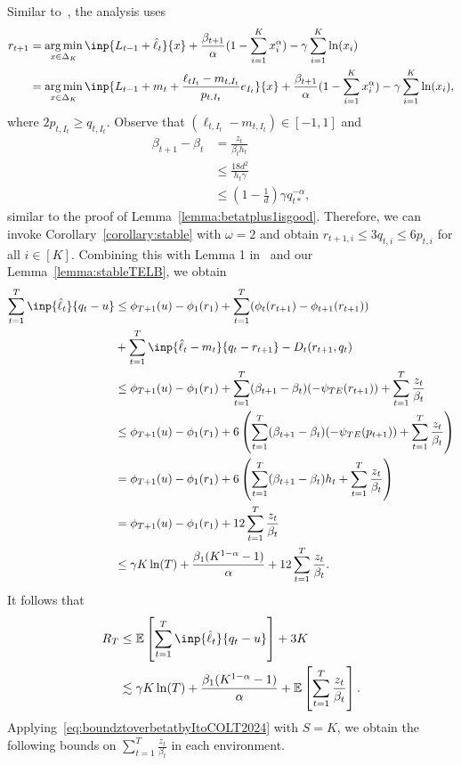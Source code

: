 Similar to~\cite{ItoCOLT2022aVariance}, the analysis uses 
\begin{align*}
    r_{t+1} &= \argmin_{x \in \Delta_K} \inp{L_{t-1} + \hat{\ell}_t}{x} + \frac{\beta_{t+1}}{\alpha}(1 - \sum_{i=1}^K x_i^\alpha) - \gamma\sum_{i=1}^K \ln(x_i) \\
    &= \argmin_{x \in \Delta_K} \inp{L_{t-1} + m_t + \frac{\ell_{tI_t} - m_{t,I_t}}{p_{t,I_t}}e_{I_t}}{x} + \frac{\beta_{t+1}}{\alpha}(1 - \sum_{i=1}^K x_i^\alpha) - \gamma\sum_{i=1}^K \ln(x_i),
\end{align*}
where $2p_{t,I_t} \geq q_{t,I_t}$.
Observe that $(\ell_{t,I_t} - m_{t,I_t}) \in [-1,1]$ and 
\begin{align*}
    \beta_{t+1} - \beta_t &= \frac{z_t}{\beta_{t}h_t} \\
    &\leq \frac{18d^2}{h_t\gamma} \\
    &\leq \left(1 - \frac{1}{d}\right)\gamma q_{t*}^{-\alpha},
\end{align*} 
similar to the proof of Lemma~\ref{lemma:betatplus1isgood}. 
%
Therefore, we can invoke Corollary~\ref{corollary:stable} with $\omega = 2$ and obtain $r_{t+1,i} \leq 3q_{t,i} \leq 6p_{t,i}$ for all $i \in [K]$. Combining this with Lemma 1 in~\cite{ItoCOLT2022aVariance} and our Lemma~\ref{lemma:stableTELB}, we obtain
\begin{align*}
    \sum_{t=1}^T \inp{\hat{\ell}_t}{q_t - u} &\leq \phi_{T+1}(u) - \phi_1(r_1)
    + \sum_{t=1}^T(\phi_{t}(r_{t+1}) - \phi_{t+1}(r_{t+1})) \\
    &+ \sum_{t=1}^T \inp{\hat{\ell}_t - m_t}{q_t - r_{t+1}} - D_t(r_{t+1}, q_t) \\
    &\leq \phi_{T+1}(u) - \phi_1(r_1) + \sum_{t=1}^T(\beta_{t+1} - \beta_t)(-\psi_{TE}(r_{t+1})) + \sum_{t=1}^T \frac{z_t}{\beta_t} \\
    &\leq \phi_{T+1}(u) - \phi_1(r_1) + 6\left(\sum_{t=1}^T(\beta_{t+1} - \beta_t)(-\psi_{TE}(p_{t+1})) + \sum_{t=1}^T \frac{z_t}{\beta_t}\right) \\
    &= \phi_{T+1}(u) - \phi_1(r_1) + 6\left(\sum_{t=1}^T(\beta_{t+1} - \beta_t)h_t + \sum_{t=1}^T \frac{z_t}{\beta_t}\right) \\
    &= \phi_{T+1}(u) - \phi_1(r_1) + 12\sum_{t=1}^T \frac{z_t}{\beta_t} \\
    &\leq \gamma K\ln(T) + \frac{\beta_1 (K^{1-\alpha} - 1)}{\alpha} + 12\sum_{t=1}^T \frac{z_t}{\beta_t}.
\end{align*}
It follows that
\begin{align*}
    R_T &\leq \E\left[\sum_{t=1}^T \inp{\hat{\ell}_t}{q_t - u}\right] + 3K \\
    &\lesssim \gamma K\ln(T) + \frac{\beta_1 (K^{1-\alpha} - 1)}{\alpha} + \E\left[\sum_{t=1}^T \frac{z_t}{\beta_t}\right].
\end{align*}
Applying~\eqref{eq:boundztoverbetatbyItoCOLT2024} with $S = K$, we obtain the following bounds on $\sum_{t=1}^T \frac{z_t}{\beta_t}$ in each environment.
